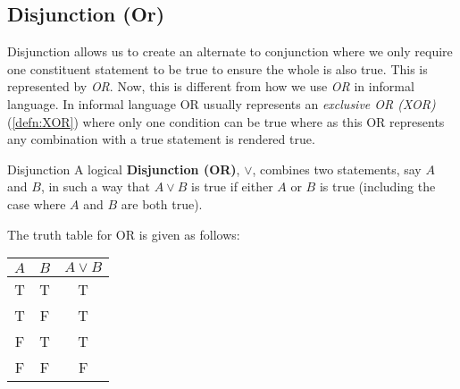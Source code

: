 \subsection{Disjunction (Or)}

Disjunction allows us to create an alternate to conjunction where we only require one constituent statement to be true to ensure the whole is also true.
This is represented by \emph{OR}.
Now, this is different from how we use \emph{OR} in informal language.
In informal language OR usually represents an \emph{exclusive OR (XOR)} (\ref{defn:XOR}) where only one condition can be true where as this OR represents any combination with a true statement is rendered true.

\begin{defn}{Disjunction}
  A logical \textbf{Disjunction (OR)}, $\lor$, combines two statements, say $A$ and $B$, in such a way that $A\lor B$ is true if either $A$ or $B$ is true (including the case where $A$ and $B$ are both true).
\end{defn}


The truth table for OR is given as follows:

\begin{minipage}{\linewidth}
  \centering
  \begin{tabular}{ccc}
    $A$ & $B$ & $A \lor B$ \\
    \toprule
    T & T & T \\
    T & F & T \\
    F & T & T \\
    F & F & F \\
  \end{tabular}
  \label{tab:disjunction} 
\end{minipage}

